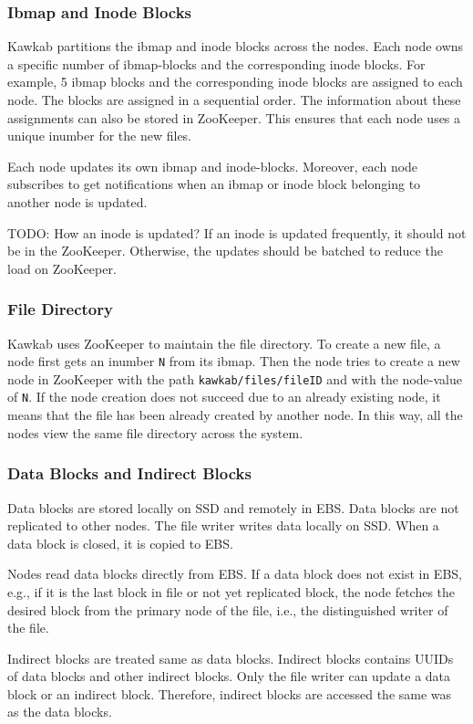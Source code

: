 \documentclass[]{article}
\newcommand{\hl}[1]{\textcolor{notecolor}{#1}}
\begin{document}
\subsubsection{Ibmap and Inode Blocks} Kawkab partitions the ibmap and inode
blocks across the nodes. Each node owns a specific number of ibmap-blocks and
the corresponding inode blocks. For example, 5 ibmap blocks and the
corresponding inode blocks are assigned to each node. The blocks are assigned
in a sequential order. The information about these assignments can also be
stored in ZooKeeper. This ensures that each node uses a unique inumber for
the new files.

Each node updates its own ibmap and inode-blocks. Moreover, each node
subscribes to get notifications when an ibmap or inode block belonging
to another node is updated.

\hl{TODO: How an inode is updated? If an inode is updated frequently, it should not
be in the ZooKeeper. Otherwise, the updates should be batched to reduce the load
on ZooKeeper.}


\subsubsection{File Directory} Kawkab uses ZooKeeper to maintain the file
directory. To create a new file, a node first gets an inumber \texttt{N} from
its ibmap. Then the node tries to create a new node in ZooKeeper with the path
\texttt{kawkab/files/fileID} and with the node-value of \texttt{N}. If the node
creation does not succeed due to an already existing node, it means that the
file has been already created by another node.  In this way, all the nodes view
the same file directory across the system.

\subsubsection{Data Blocks and Indirect Blocks}
Data blocks are stored locally on SSD and remotely in EBS. Data blocks
are not replicated to other nodes. The file writer writes data locally on
SSD. When a data block is closed, it is copied to EBS.

Nodes read data blocks directly from EBS. If a data block does not exist
in EBS, e.g., if it is the last block in file or not yet replicated block,
the node fetches the desired block from the primary node of the file, i.e., 
the distinguished writer of the file.

Indirect blocks are treated same as data blocks. Indirect blocks
contains UUIDs of data blocks and other indirect blocks. Only the file
writer can update a data block or an indirect block. Therefore, indirect
blocks are accessed the same was as the data blocks.
\end{document}
